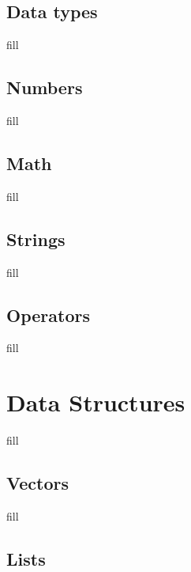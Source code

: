 \documentclass[
  b5paper]{book}
\begin{document}
\hypertarget{data-types}{%
\subsection*{Data types}\label{data-types}}

fill

\hypertarget{numbers}{%
\subsection*{Numbers}\label{numbers}}

fill

\hypertarget{math}{%
\subsection*{Math}\label{math}}

fill

\hypertarget{strings}{%
\subsection*{Strings}\label{strings}}

fill

\hypertarget{operators}{%
\subsection*{Operators}\label{operators}}

fill

\hypertarget{data-structures}{%
\section{Data Structures}\label{data-structures}}

fill

\hypertarget{vectors}{%
\subsection*{Vectors}\label{vectors}}

fill

\hypertarget{lists}{%
\subsection*{Lists}\label{lists}}
\end{document}
